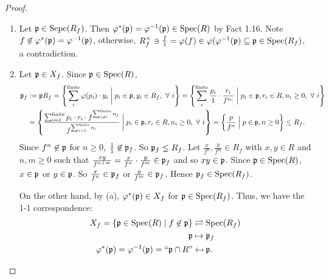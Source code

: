 \begin{proof}
    \begin{enumerate}
        \item Let $\mathfrak{p} \in \operatorname{Sepc}(R_f)$. Then $\varphi^*(\mathfrak{p}) = \varphi^{-1}(\mathfrak{p}) \in \operatorname{Spec}(R)$ by Fact 1.16. Note $f \not \in \varphi^*(\mathfrak{p}) = \varphi^{-1}(\mathfrak{p})$, otherwise, $R_f^\times \ni \frac{f}{1} = \varphi(f) \in \varphi(\varphi^{-1}(\mathfrak{p}) \subseteq \mathfrak{p} \in \operatorname{Spec}(R_f)$, a contradiction. 
        \item 
            Let $\mathfrak{p} \in X_f$. Since $\mathfrak{p} \in \operatorname{Spec}(R)$,
            \begin{align*}
                \mathfrak{p}_f &:= \mathfrak{p} R_f = \left\{\sum_{i}^{\text{finite}} \varphi(p_{i}) \cdot y_{i} \mathrel{\bigg |} p_{i} \in \mathfrak{p},y_{i} \in R_{f}, \ \forall \  i\right\} = \left\{\sum_{i}^{\text{finite}} \frac{p_{i}}{1} \cdot \frac{r_{i}}{f^{n_{i}}} \mathrel{\bigg |} p_{i} \in \mathfrak{p}, r_{i} \in R, n_{i} \geq 0,\ \forall \  i\right\} \\
                &= \left\{\frac{\sum_{i=1}^{\text{finite}}p_{i} \cdot r_{i} \cdot f^{\sum_{j \neq i}^{\text{finite}}n_{j}}}{f^{\sum_{i=1}^{\text{finite}} n_{i}}} \mathrel{\bigg |} p_{i} \in \mathfrak{p}, r_{i} \in R, n_{i} \geq 0, \ \forall \  i\right\} = \left\{ \frac{p}{f^{n}} \mathrel{\Big |} p \in \mathfrak{p},n \geq 0\right\} \leq R_f.
            \end{align*}
            Since $f^n \not \in \mathfrak{p}$ for $n \geq 0$, $\frac{1}{1} \not \in \mathfrak{p}_f$. So $\mathfrak{p}_f \lneq R_f$. Let $\frac{x}{f^n},\frac{y}{f^m} \in R_f$ with $x,y \in R$ and $n,m \geq 0$ such that $\frac{xy}{f^{n+m}} = \frac{x}{f^n} \cdot \frac{y}{f^m} \in \mathfrak{p}_f$ and so $xy \in \mathfrak{p}$. Since $\mathfrak{p} \in \operatorname{Spec}(R)$, $x \in \mathfrak{p}$ or $y \in \mathfrak{p}$. So $\frac{x}{f^n} \in \mathfrak{p}_f$ or $\frac{y}{f^m} \in \mathfrak{p}_f$. Hence $\mathfrak{p}_f \in \operatorname{Spec}(R_f)$. \par 
            On the other hand, by (a), $\varphi^{*}(\mathfrak{p}) \in X_{f}$ for $\mathfrak{p} \in \operatorname{Spec}(R_{f})$. Thus, we have the 1-1 correspondence:
            \begin{align*}
                X_f = \{\mathfrak{p} \in \operatorname{Spec}(R) \mid f \not \in \mathfrak{p}\} & \rightleftarrows \operatorname{Spec}(R_f) \\
                \mathfrak{p} &\mapsto \mathfrak{p}_f \\ 
                \varphi^*(\mathfrak{p}) = \varphi^{-1}(\mathfrak{p}) = \text{``$\mathfrak{p} \cap R$''} &\mapsfrom \mathfrak{p}. \qedhere
            \end{align*}
    \end{enumerate}
\end{proof}

